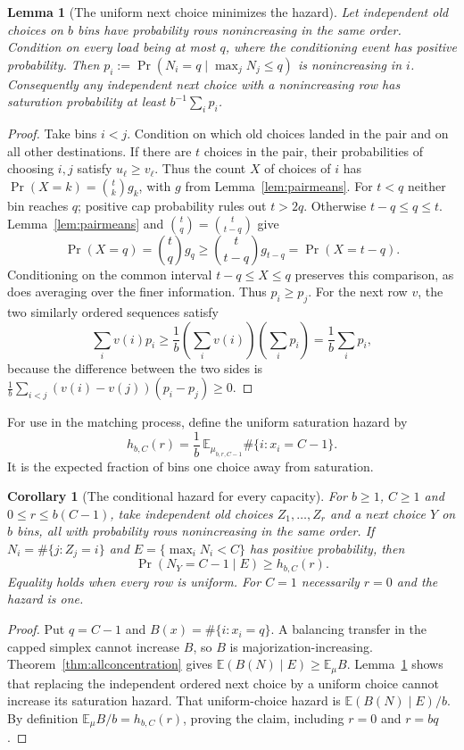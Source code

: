 \documentclass[11pt]{article}
\newtheorem{lemma}[theorem]{Lemma}
\newtheorem{corollary}[theorem]{Corollary}
\begin{document}
\begin{lemma}[The uniform next choice minimizes the hazard]\label{lem:nextuniform}
Let independent old choices on $b$ bins have probability rows
nonincreasing in the same order. Condition on every load being at
most $q$, where the conditioning event has positive probability.
Then $p_i:=\Pr(N_i=q\mid\max_jN_j\leq q)$ is nonincreasing in $i$.
Consequently any independent next choice with a nonincreasing row
has saturation probability at least $b^{-1}\sum_i p_i$.
\end{lemma}
\begin{proof}
Take bins $i<j$. Condition on which old choices landed in the pair
and on all other destinations. If there are $t$ choices in the pair,
their probabilities of choosing $i,j$ satisfy $u_\ell\geq v_\ell$.
Thus the count $X$ of choices of $i$ has
$\Pr(X=k)=\binom tk g_k$, with $g$ from Lemma~\ref{lem:pairmeans}.
For $t<q$ neither bin reaches $q$; positive cap probability rules out
$t>2q$. Otherwise $t-q\leq q\leq t$. Lemma~\ref{lem:pairmeans}
and $\binom tq=\binom t{t-q}$ give
\[
 \Pr(X=q)=\binom tq g_q\geq\binom t{t-q}g_{t-q}=\Pr(X=t-q).
\]
Conditioning on the common interval $t-q\leq X\leq q$ preserves
this comparison, as does averaging over the finer information.
Thus $p_i\geq p_j$. For the next row $v$, the two similarly ordered
sequences satisfy
\[
 \sum_i v(i)p_i\geq\frac1b\left(\sum_i v(i)\right)
                                  \left(\sum_i p_i\right)
 =\frac1b\sum_i p_i,
\]
because the difference between the two sides is
$\frac1b\sum_{i<j}(v(i)-v(j))(p_i-p_j)\geq0$.
\end{proof}

For use in the matching process, define the uniform saturation hazard by
\[
 h_{b,C}(r)=\frac1b\,
 \mathbb E_{\mu_{b,r,C-1}}\#\{i:x_i=C-1\}.
\]
It is the expected fraction of bins one choice away from saturation.

\begin{corollary}[The conditional hazard for every capacity]\label{cor:allhazard}
For $b\geq1$, $C\geq1$ and $0\leq r\leq b(C-1)$, take independent
old choices $Z_1,\ldots,Z_r$ and a next choice $Y$ on $b$ bins,
all with probability rows nonincreasing in the same order. If
$N_i=\#\{j:Z_j=i\}$ and $E=\{\max_iN_i<C\}$ has positive probability,
then
\[
 \Pr(N_Y=C-1\mid E)\geq h_{b,C}(r).
\]
Equality holds when every row is uniform. For $C=1$ necessarily
$r=0$ and the hazard is one.
\end{corollary}
\begin{proof}
Put $q=C-1$ and $B(x)=\#\{i:x_i=q\}$. A balancing transfer in
the capped simplex cannot increase $B$, so $B$ is
majorization-increasing. Theorem~\ref{thm:allconcentration} gives
$\mathbb E(B(N)\mid E)\geq\mathbb E_\mu B$.
Lemma~\ref{lem:nextuniform} shows that replacing the independent ordered
next choice by a uniform choice cannot increase its saturation hazard.
That uniform-choice hazard is $\mathbb E(B(N)\mid E)/b$.
By definition $\mathbb E_\mu B/b=h_{b,C}(r)$, proving the claim,
including $r=0$ and $r=bq$.
\end{proof}
\end{document}
